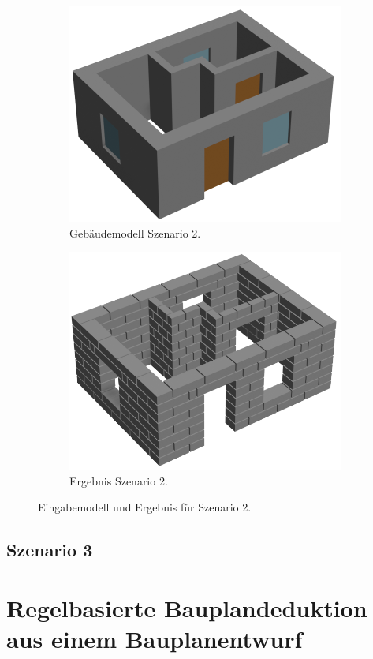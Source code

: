 \begin{figure}[htb]
  \begin{subfigure}[b]{0.49\columnwidth}
    \includegraphics[width=\columnwidth]{fig/scenario2_rendering_input.png}
    \caption{Gebäudemodell Szenario 2.}\label{fig:poc:scenario2 modell}
  \end{subfigure}
  \hfill
  \begin{subfigure}[b]{0.49\columnwidth}
    \includegraphics[width=\columnwidth]{fig/scenario2_render.png}
    \caption{Ergebnis Szenario 2.}\label{fig:poc:scenario2_ergebnis}
  \end{subfigure}
\caption{Eingabemodell und Ergebnis für Szenario 2.}\label{fig:poc:result_scenario2}
\end{figure}

\subsection{Szenario 3}\label{poc:scenario3}
\section{Regelbasierte Bauplandeduktion aus einem Bauplanentwurf}
